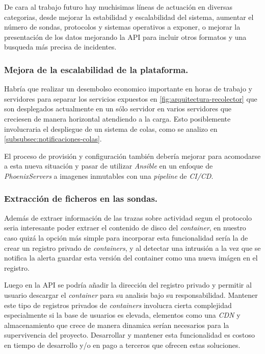 De cara al trabajo futuro hay muchisimas líneas de actuación en diversas categorias, desde mejorar la estabilidad 
y escalabilidad del sistema, aumentar el número de sondas, protocolos y sistemas operativos a exponer, o 
mejorar la presentación de los datos mejorando la API para incluir otros formatos y una busqueda más precisa de incidentes.

\subsubsection{Mejora de la escalabilidad de la plataforma.}

Habría que realizar un desembolso economico importante en horas de trabajo y servidores para separar los servicios expuestos
en \ref{fig:arquitectura-recolector} que son desplegados actualmente en un sólo servidor en varios servidores que creciesen
de manera horizontal atendiendo a la carga. Esto posiblemente involucraria el despliegue de un sistema de colas, como se analizo
en \ref{subsubsec:notificaciones-colas}.

El proceso de provisión y configuración también debería mejorar para acomodarse a esta nueva situación y pasar de utilizar \emph{Ansible}
en un enfoque de \emph{PhoenixServers} a imagenes inmutables con una \emph{pipeline} de \emph{CI/CD}.

\subsubsection{Extracción de ficheros en las sondas.}

Además de extraer información de las trazas sobre actividad segun el protocolo seria interesante poder extraer el contenido de disco del \emph{container},
en nuestro caso quizá la opción más simple para incorporar esta funcionalidad sería la de crear un registro privado de \emph{containers}, y al detectar 
una intrusión a la vez que se notifica la alerta guardar esta versión del container como una nueva imágen en el registro.

Luego en la API se podría añadir la dirección del registro privado y permitir al usuario descargar el \emph{container} para su analisis bajo su responsabilidad. 
    Mantener este tipo de registros privados de \emph{containers} involucra cierta complejidad especialmente si la base de usuarios es elevada, elementos como
una \emph{CDN} y almacenamiento que crece de manera dinamica serían necesarios para la supervivencia del proyecto. Desarrollar y mantener esta funcionalidad
es costoso en tiempo de desarrollo y/o en pago a terceros que ofrecen estas soluciones.

